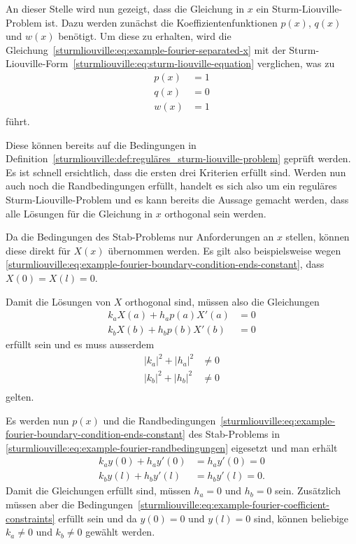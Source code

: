 %
%

An dieser Stelle wird nun gezeigt, dass die Gleichung in $x$ ein
Sturm-Liouville-Problem ist.
Dazu werden zunächst die Koeffizientenfunktionen $p(x)$, $q(x)$ und $w(x)$
benötigt.
Um diese zu erhalten, wird die 
Gleichung~\eqref{sturmliouville:eq:example-fourier-separated-x} mit der
Sturm-Liouville-Form~\eqref{sturmliouville:eq:sturm-liouville-equation}
verglichen, was zu 
\[
\begin{aligned} 
    p(x) &= 1 \\
    q(x) &= 0 \\
    w(x) &= 1
\end{aligned}
\]
führt.

Diese können bereits auf die Bedingungen in
Definition~\ref{sturmliouville:def:reguläres_sturm-liouville-problem} geprüft
werden.
Es ist schnell ersichtlich, dass die ersten drei Kriterien erfüllt sind.
Werden nun auch noch die Randbedingungen erfüllt, handelt es sich also um ein
reguläres Sturm-Liouville-Problem und es kann bereits die Aussage gemacht
werden, dass alle Lösungen für die Gleichung in $x$ orthogonal sein werden.

Da die Bedingungen des Stab-Problems nur Anforderungen an $x$ stellen, können
diese direkt für $X(x)$ übernommen werden.
Es gilt also beispielsweise wegen
\eqref{sturmliouville:eq:example-fourier-boundary-condition-ends-constant},
dass $X(0) = X(l) = 0$.

Damit die Lösungen von $X$ orthogonal sind, müssen also die Gleichungen
\begin{equation}
\begin{aligned}
	\label{sturmliouville:eq:example-fourier-randbedingungen}
	k_a X(a) + h_a p(a) X'(a) &= 0 \\
	k_b X(b) + h_b p(b) X'(b) &= 0
\end{aligned}
\end{equation}
erfüllt sein und es muss ausserdem
\begin{equation}
\begin{aligned}
    \label{sturmliouville:eq:example-fourier-coefficient-constraints}
    |k_a|^2 + |h_a|^2 &\neq 0\\
    |k_b|^2 + |h_b|^2 &\neq 0\\
\end{aligned}
\end{equation}
gelten.

Es werden nun $p(x)$ und die 
Randbedingungen~\eqref{sturmliouville:eq:example-fourier-boundary-condition-ends-constant}
des Stab-Problems in \eqref{sturmliouville:eq:example-fourier-randbedingungen}
eigesetzt und man erhält
\[
\begin{aligned}
	k_a y(0) + h_a y'(0) &= h_a y'(0) = 0 \\
	k_b y(l) + h_b y'(l) &= h_b y'(l) = 0.
\end{aligned}
\]
Damit die Gleichungen erfüllt sind, müssen $h_a = 0$ und $h_b = 0$ sein.
Zusätzlich müssen aber die 
Bedingungen~\eqref{sturmliouville:eq:example-fourier-coefficient-constraints}
erfüllt sein und da $y(0) = 0$ und $y(l) = 0$ sind, können beliebige $k_a \neq 0$
und $k_b \neq 0$ gewählt werden.

